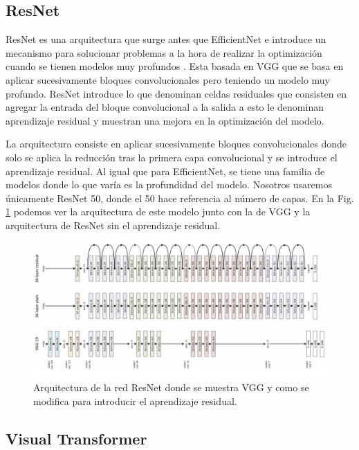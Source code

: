\documentclass[a4paper,12pt,twoside,titlepage]{article}
\begin{document}
\subsection*{ResNet}
ResNet es una arquitectura que surge antes que EfficientNet e introduce un mecanismo para solucionar problemas a la hora de realizar la optimización cuando se tienen modelos muy profundos \cite{resnet}. Esta basada en VGG \cite{vgg} que se basa en aplicar sucesivamente bloques convolucionales pero teniendo un modelo muy profundo. ResNet introduce lo que denominan celdas residuales que consisten en agregar la entrada del bloque convolucional a la salida \cite{resnet} a esto le denominan aprendizaje residual y muestran una mejora en la optimización del modelo.

La arquitectura consiste en aplicar sucesivamente bloques convolucionales donde solo se aplica la reducción tras la primera capa convolucional y se introduce el aprendizaje residual. Al igual que para EfficientNet, se tiene una familia de modelos donde lo que varía es la profundidad del modelo. Nosotros usaremos únicamente ResNet 50, donde el 50 hace referencia al número de capas. En la Fig. \ref{fig:resnet} podemos ver la arquitectura de este modelo junto con la de VGG y la arquitectura de ResNet sin el aprendizaje residual.

\begin{figure}[h!]
  \centering
  \includegraphics[scale=1.0, center]{resnet50.png}
  \caption{Arquitectura de la red ResNet donde se muestra VGG y como se modifica para introducir el aprendizaje residual.}
  \label{fig:resnet}
\end{figure}


\subsection*{Visual Transformer}
\end{document}
